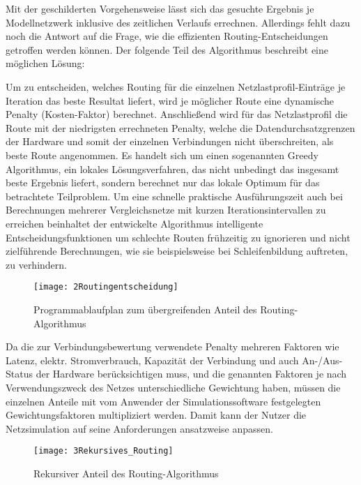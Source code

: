 Mit der geschilderten Vorgehensweise lässt sich das gesuchte Ergebnis je Modellnetzwerk inklusive des zeitlichen Verlaufs errechnen. Allerdings fehlt dazu noch die Antwort auf die Frage, wie die effizienten Routing-Entscheidungen getroffen werden können. Der folgende Teil des Algorithmus beschreibt eine möglichen Lösung:


Um zu entscheiden, welches Routing für die einzelnen Netzlastprofil-Einträge je Iteration das beste Resultat liefert, wird je möglicher Route eine dynamische Penalty (Kosten-Faktor) berechnet. Anschließend wird für das Netzlastprofil die Route mit der niedrigsten errechneten Penalty, welche die Datendurchsatzgrenzen der Hardware und somit der einzelnen Verbindungen nicht überschreiten, als beste Route angenommen. Es handelt sich um einen sogenannten Greedy Algorithmus, ein lokales Lösungsverfahren, das nicht unbedingt das insgesamt beste Ergebnis liefert, sondern berechnet nur das lokale Optimum für das betrachtete Teilproblem. Um eine schnelle praktische Ausführungszeit auch bei Berechnungen mehrerer Vergleichsnetze mit kurzen Iterationsintervallen zu erreichen beinhaltet der entwickelte Algorithmus intelligente Entscheidungsfunktionen um schlechte Routen frühzeitig zu ignorieren und nicht zielführende Berechnungen, wie sie beispielsweise bei Schleifenbildung auftreten, zu verhindern.
\begin{figure}[ht]
	\centering
	\texttt{[image: 2Routingentscheidung]}
	\caption{Programmablaufplan zum übergreifenden Anteil des Routing-Algorithmus}
	\label{fig:2Routingentscheidung}
\end{figure}

Da die zur Verbindungsbewertung verwendete Penalty mehreren Faktoren wie Latenz, elektr. Stromverbrauch, Kapazität der Verbindung und auch An-/Aus-Status der Hardware berücksichtigen muss, und die genannten Faktoren je nach Verwendungszweck des Netzes unterschiedliche Gewichtung haben, müssen die einzelnen Anteile mit vom Anwender der Simulationssoftware festgelegten Gewichtungsfaktoren multipliziert werden. Damit kann der Nutzer die Netzsimulation auf seine Anforderungen ansatzweise anpassen.
\begin{figure}[ht]
	\centering
	\texttt{[image: 3Rekursives\_Routing]}
	\caption{Rekursiver Anteil des Routing-Algorithmus}
	\label{fig:3Rekursives_Routing}
\end{figure}


